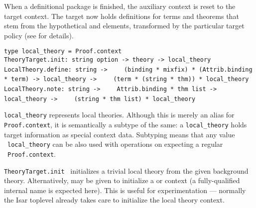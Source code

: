 \begin{isabellebody}
\begin{isamarkuptext}
  \noindent When a definitional package is finished, the auxiliary
  context is reset to the target context.  The target now holds
  definitions for terms and theorems that stem from the hypothetical
  \isa{{\isasymDEFINE}} and \isa{{\isasymNOTE}} elements, transformed by
  the particular target policy (see
  \cite[\S4--5]{Haftmann-Wenzel:2009} for details).%
\end{isamarkuptext}%
\isamarkuptrue%
%
\isadelimmlref
%
\endisadelimmlref
%
\isatagmlref
%
\begin{isamarkuptext}%
\begin{mldecls}
  \verb|type local_theory = Proof.context| \\
  \verb|TheoryTarget.init: string option -> theory -> local_theory| \\[1ex]
  \verb|LocalTheory.define: string ->|\isasep\isanewline%
\verb|    (binding * mixfix) * (Attrib.binding * term) -> local_theory ->|\isasep\isanewline%
\verb|    (term * (string * thm)) * local_theory| \\
  \verb|LocalTheory.note: string ->|\isasep\isanewline%
\verb|    Attrib.binding * thm list -> local_theory ->|\isasep\isanewline%
\verb|    (string * thm list) * local_theory| \\
  \end{mldecls}

  \begin{description}

  \item \verb|local_theory| represents local theories.  Although
  this is merely an alias for \verb|Proof.context|, it is
  semantically a subtype of the same: a \verb|local_theory| holds
  target information as special context data.  Subtyping means that
  any value ~\verb|local_theory| can be also used
  with operations on expecting a regular ~\verb|Proof.context|.

  \item \verb|TheoryTarget.init|~ initializes a
  trivial local theory from the given background theory.
  Alternatively,  may be given to initialize a
  \hyperlink{command.locale}{\mbox{}} or \hyperlink{command.class}{\mbox{}} context (a fully-qualified
  internal name is expected here).  This is useful for experimentation
  --- normally the Isar toplevel already takes care to initialize the
  local theory context.


\end{description}
\end{isamarkuptext}
\end{isabellebody}
